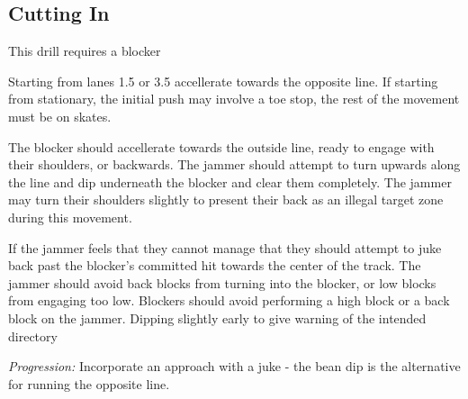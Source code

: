 \subsection*{Cutting In}
\label{drill:line_to_line_jamming:bean_dip}

This drill requires a blocker

Starting from lanes 1.5 or 3.5 accellerate towards the opposite line.
If starting from stationary, the initial push may involve a toe stop, the rest of the movement must be on skates.

The blocker should accellerate towards the outside line, ready to engage with their shoulders, or backwards.
The jammer should attempt to turn upwards along the line and dip underneath the blocker and clear them completely.
The jammer may turn their shoulders slightly to present their back as an illegal target zone during this movement.

If the jammer feels that they cannot manage that they should attempt to juke back past the blocker's committed hit towards the center of the track.
The jammer should avoid back blocks from turning into the blocker, or low blocks from engaging too low.   
Blockers should avoid performing a high block or a back block on the jammer.
Dipping slightly early to give warning of the intended directory



%


{\it Progression:} Incorporate an approach with a juke - the bean dip is the alternative for running the opposite line.   
